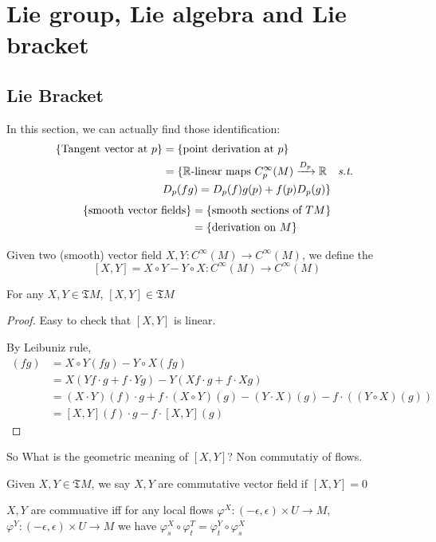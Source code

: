 \section{Lie group, Lie algebra and Lie bracket}
\subsection{Lie Bracket}
In this section, we can actually find those identification:
\begin{align*}
    \{\text{Tangent vector at $ p $}\}&=\{\text{point derivation at $ p $}\}\\
    &=\{\text{$ \mathbb{R} $-linear maps  $ C^\infty_p(M)\xrightarrow{D_p} \mathbb{R} $ \st}\\&D_p(fg)=D_p(f)g(p)+f(p)D_p(g)\}
\end{align*}
\begin{align*}
    \{\text{smooth vector fields}\}&=\{\text{smooth sections of  $ TM $}\}\\
    &=\{\text{derivation on  $ M $}\}
\end{align*}
\begin{definition}
    Given two (smooth) vector field  $ X,Y:C^\infty(M)\rightarrow C^\infty(M) $, we define the 
    \[[X,Y]=X\circ Y-Y\circ X:C^\infty(M)\rightarrow C^\infty(M)\] 
\end{definition}
\begin{theorem}
    For any  $ X,Y\in\mathfrak{T}M $,  $ [X,Y]\in \mathfrak{T}M $  
\end{theorem}
\begin{proof}
    Easy to check that  $ [X,Y] $ is linear.
    
    By Leibuniz rule,
    \begin{align*}
        [X,Y](fg)&=X\circ Y(fg)-Y\circ X(fg)\\
        &=X(Yf\cdot g+f\cdot Yg)-Y(Xf\cdot g+f\cdot Xg)\\
        &=(X\cdot Y)(f)\cdot g+f\cdot(X\circ Y)(g)-(Y\cdot X)(g)-f\cdot ((Y\circ X)(g))\\
        &=[X,Y](f)\cdot g- f\cdot [X,Y](g)
    \end{align*}
\end{proof}
So What is the geometric meaning of  $ [X,Y] $? Non commutatiy of flows.
\begin{fact}
    Given  $ X,Y\in \mathfrak{T}M $, we say  $ X,Y $ are commutative vector field if  $ [X,Y]=0 $
    
    $ X,Y $ are commuative iff  for any local flows  $ \varphi^X:(-\epsilon,\epsilon)\times U\rightarrow M $, $ \varphi^Y:(-\epsilon,\epsilon)\times U\rightarrow M $  we have $ \varphi_s^X\circ \varphi_t^T=\varphi_t^Y\circ\varphi_s^X $   
\end{fact} 


